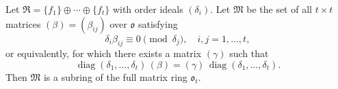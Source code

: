 Let $\mathfrak{R} = \{f_1\} \oplus \cdots \oplus \{f_t\}$ with order ideals $(\delta_i)$. Let $\mathfrak{M}$ be the set of all $t \times t$ matrices $(\beta) = (\beta_{ij})$ over $\mathfrak{o}$ satisfying
$$\delta_i \beta_{ij} \equiv 0 \pmod{\delta_j}, \quad i, j = 1, \ldots, t,$$
or equivalently, for which there exists a matrix $(\gamma)$ such that
$$\operatorname{diag}(\delta_1, \ldots, \delta_t)\, (\beta) = (\gamma)\, \operatorname{diag}(\delta_1, \ldots, \delta_t).$$
Then $\mathfrak{M}$ is a subring of the full matrix ring $\mathfrak{o}_t$.
